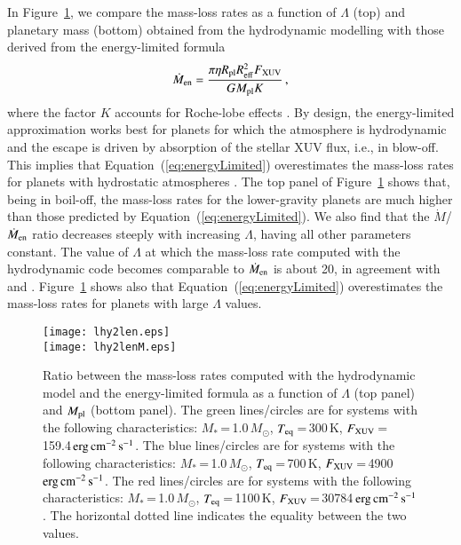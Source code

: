 \documentclass{aa}
\def\ergscm{$\rm erg\,cm^{-2}\,s^{-1}$}
\begin{document}
In Figure~\ref{fig:lhy2len}, we compare the mass-loss rates as a function of $\Lambda$ (top) and planetary mass (bottom) obtained from the hydrodynamic modelling with those derived from the energy-limited formula
%
\begin{equation}
\dot{M}_{\rm en}=\frac{\pi\eta R_{\rm pl}R_{\rm eff}^2F_{\rm XUV}}{GM_{\rm pl}K}\,,
\label{eq:energyLimited}
\end{equation}
%
where the factor $K$ accounts for Roche-lobe effects \citep{erkaev2007}. By design, the energy-limited approximation works best for planets for which the atmosphere is hydrodynamic and the escape is driven by absorption of the stellar XUV flux, i.e., in blow-off. This implies that Equation~(\ref{eq:energyLimited}) overestimates the mass-loss rates for planets with hydrostatic atmospheres \citep[see e.g.,][]{fossati2018}. The top panel of Figure~\ref{fig:lhy2len} shows that, being in boil-off, the mass-loss rates for the lower-gravity planets are much higher than those predicted by Equation~(\ref{eq:energyLimited}). We also find that the $\dot{M}$/$\dot{M}_{\rm en}$ ratio decreases steeply with increasing $\Lambda$, having all other parameters constant. The value of $\Lambda$ at which the mass-loss rate computed with the hydrodynamic code becomes comparable to $\dot{M}_{\rm en}$ is about 20, in agreement with \citet{owen2016b} and \citet{fossati2017}. Figure~\ref{fig:lhy2len} shows also that Equation~(\ref{eq:energyLimited}) overestimates the mass-loss rates for planets with large $\Lambda$ values.
\begin{figure}[h!]
\texttt{[image: lhy2len.eps]}\\
\texttt{[image: lhy2lenM.eps]}
\caption{Ratio between the mass-loss rates computed with the hydrodynamic model and the energy-limited formula as a function of $\Lambda$ (top panel) and $M_{\rm pl}$ (bottom panel). The green lines/circles are for systems with the following characteristics: $M_*$\,=\,1.0\,$M_{\odot}$, $T_{\rm eq}$\,=\,300\,K, $F_{\rm XUV}$\,=\,159.4\,\ergscm. The blue lines/circles are for systems with the following characteristics: $M_*$\,=\,1.0\,$M_{\odot}$, $T_{\rm eq}$\,=\,700\,K, $F_{\rm XUV}$\,=\,4900\,\ergscm. The red lines/circles are for systems with the following characteristics: $M_*$\,=\,1.0\,$M_{\odot}$, $T_{\rm eq}$\,=\,1100\,K, $F_{\rm XUV}$\,=\,30784\,\ergscm. The horizontal dotted line indicates the equality between the two values.}
\label{fig:lhy2len}
\end{figure}
\end{document}
